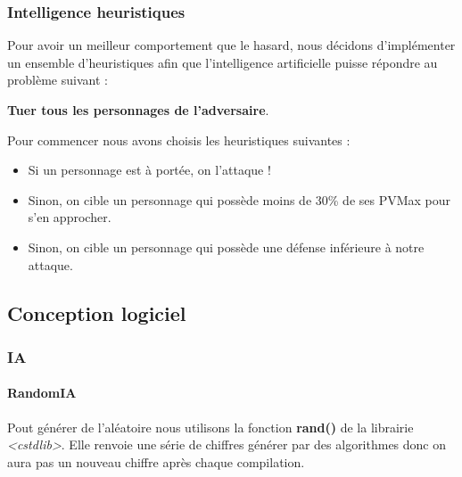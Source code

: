 \documentclass[a4paper,12pt]{article}
\begin{document}
\subsubsection{Intelligence heuristiques}
Pour avoir un meilleur comportement que le hasard, nous décidons d'implémenter un ensemble d'heuristiques afin que l'intelligence artificielle puisse répondre au problème suivant :\\
\begin{center}
\textbf{Tuer tous les personnages de l'adversaire}.
\end{center}
Pour commencer nous avons choisis les heuristiques suivantes :\\
\begin{itemize}
\item Si un personnage est à portée, on l'attaque !
\item Sinon, on cible un personnage qui possède moins de 30\% de ses PVMax pour s'en approcher.
\item Sinon, on cible un personnage qui possède une défense inférieure à notre attaque.
\end{itemize}
\clearpage

\clearpage
\subsection{Conception logiciel}
\subsubsection{IA}
\paragraph{RandomIA}
Pout générer de l'aléatoire nous utilisons la fonction \textbf{rand()} de la librairie \textit{<cstdlib>}. Elle renvoie une série de chiffres générer par des algorithmes donc on aura pas un nouveau chiffre après chaque compilation.
\end{document}
